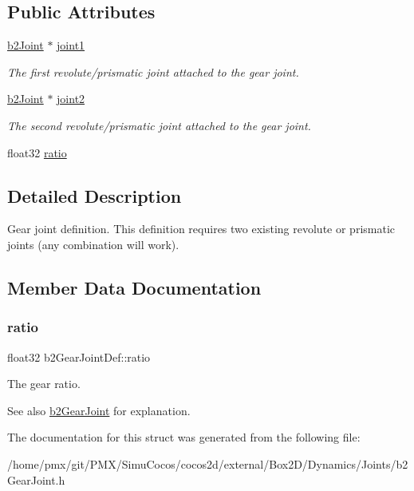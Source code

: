 \subsection*{Public Attributes}
\begin{DoxyCompactItemize}
\item 
\mbox{\label{structb2GearJointDef_ae8bc436485ff40ce8f85f55e5f7e0b66}} 
\hyperlink{classb2Joint}{b2\+Joint} $\ast$ \hyperlink{structb2GearJointDef_ae8bc436485ff40ce8f85f55e5f7e0b66}{joint1}
\begin{DoxyCompactList}\small\item\em The first revolute/prismatic joint attached to the gear joint. \end{DoxyCompactList}\item 
\mbox{\label{structb2GearJointDef_ad88473a1c384a5be515025dcb164f676}} 
\hyperlink{classb2Joint}{b2\+Joint} $\ast$ \hyperlink{structb2GearJointDef_ad88473a1c384a5be515025dcb164f676}{joint2}
\begin{DoxyCompactList}\small\item\em The second revolute/prismatic joint attached to the gear joint. \end{DoxyCompactList}\item 
float32 \hyperlink{structb2GearJointDef_a57e9f4b6ce1ddc8b89b8455515f69323}{ratio}
\end{DoxyCompactItemize}


\subsection{Detailed Description}
Gear joint definition. This definition requires two existing revolute or prismatic joints (any combination will work). 

\subsection{Member Data Documentation}
\mbox{\label{structb2GearJointDef_a57e9f4b6ce1ddc8b89b8455515f69323}} 
\subsubsection{\texorpdfstring{ratio}{ratio}}
{\footnotesize\ttfamily float32 b2\+Gear\+Joint\+Def\+::ratio}

The gear ratio. \begin{DoxySeeAlso}{See also}
\hyperlink{classb2GearJoint}{b2\+Gear\+Joint} for explanation. 
\end{DoxySeeAlso}


The documentation for this struct was generated from the following file\+:\begin{DoxyCompactItemize}
\item 
/home/pmx/git/\+P\+M\+X/\+Simu\+Cocos/cocos2d/external/\+Box2\+D/\+Dynamics/\+Joints/b2\+Gear\+Joint.\+h\end{DoxyCompactItemize}
